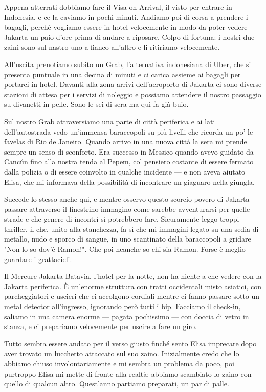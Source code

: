 Appena atterrati dobbiamo fare il Visa on Arrival, il visto per entrare in Indonesia, e ce la caviamo in pochi minuti. Andiamo poi di corsa a prendere i bagagli, perché vogliamo essere in hotel velocemente in modo da poter vedere Jakarta un paio d'ore prima di andare a riposare. Colpo di fortuna: i nostri due zaini sono sul nastro uno a fianco all'altro e li ritiriamo velocemente.

All'uscita prenotiamo subito un Grab, l'alternativa indonesiana di Uber, che si presenta puntuale in una decina di minuti e ci carica assieme ai bagagli per portarci in hotel. Davanti alla zona arrivi dell'aeroporto di Jakarta ci sono diverse stazioni di attesa per i servizi di noleggio e possiamo attendere il nostro passaggio su divanetti in pelle. Sono le sei di sera ma qui fa già buio.

Sul nostro Grab attraversiamo una parte di città periferica e ai lati dell'autostrada vedo un'immensa baraccopoli su più livelli che ricorda un po' le favelas di Rio de Janeiro. Quando arrivo in una nuova città la sera mi prende sempre un senso di sconforto. Era successo in Messico quando avevo guidato da Cancún fino alla nostra tenda al Pepem, col pensiero costante di essere fermato dalla polizia o di essere coinvolto in qualche incidente — e non aveva aiutato Elisa, che mi informava della possibilità di incontrare un giaguaro nella giungla.

Succede lo stesso anche qui, e mentre osservo questo scorcio povero di Jakarta passare attraverso il finestrino immagino come sarebbe avventurarsi per quelle strade e che genere di incontri si potrebbero fare. Sicuramente leggo troppi thriller, il che, unito alla stanchezza, fa sì che mi immagini legato su una sedia di metallo, nudo e sporco di sangue, in uno scantinato della baraccopoli a gridare "Non lo so dov'è Ramon!". Che poi neanche so chi sia Ramon. Forse è meglio guardare i grattacieli.

Il Mercure Jakarta Batavia, l'hotel per la notte, non ha niente a che vedere con la Jakarta periferica. È un'enorme struttura con tratti occidentali misto asiatici, con parcheggiatori e uscieri che ci accolgono cordiali mentre ci fanno passare sotto un metal detector all'ingresso, ignorando però tutti i bip. Facciamo il check-in, saliamo in una camera enorme — pagata pochissimo — con doccia di vetro in stanza, e ci prepariamo velocemente per uscire a fare un giro.

Tutto sembra essere andato per il verso giusto finché sento Elisa imprecare dopo aver trovato un lucchetto attaccato sul suo zaino. Inizialmente credo che lo abbiamo chiuso involontariamente e mi sembra un problema da poco, poi purtroppo Elisa mi mette di fronte alla realtà: abbiamo scambiato lo zaino con quello di qualcun altro. Quest'anno partiamo preparati, un par di palle.

